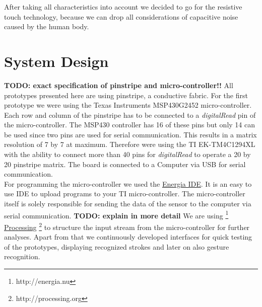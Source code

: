 After taking all characteristics into account we decided to go for the resistive touch technology, because we can drop all considerations of capacitive noise caused by the human body. 

\section{System Design}
\textbf{TODO: exact specification of pinstripe and micro-controller!!}
All prototypes presented here are using pinstripe, a conductive fabric. For the first prototype we were using the Texas Instruments MSP430G2452 micro-controller. Each row and column of the pinstripe has to be connected to a \emph{digitalRead} pin of the micro-controller. The MSP430 controller has 16 of these pins but only 14 can be used since two pins are used for serial communication. This results in a matrix resolution of 7 by 7 at maximum. Therefore were using the TI EK-TM4C1294XL with the ability to connect more than 40 pins for \emph{digitalRead} to operate a 20 by 20 pinstripe matrix. The board is connected to a Computer via USB for serial communication.\\

For programming the micro-controller we used the \href{http://energia.nu}{Energia IDE}. It is an easy to use IDE to upload programs to your TI micro-controller. The micro-controller itself is solely responsible for sending the data of the sensor to the computer via serial communication.  \textbf{TODO: explain in more detail} We are using \footnote{http://energia.nu} \href{http://processing.org}{Processing} \footnote{http://processing.org} to structure the input stream from the micro-controller for further analyses. Apart from that we continuously developed interfaces for quick testing of the prototypes, displaying recognized strokes and later on also gesture recognition. 